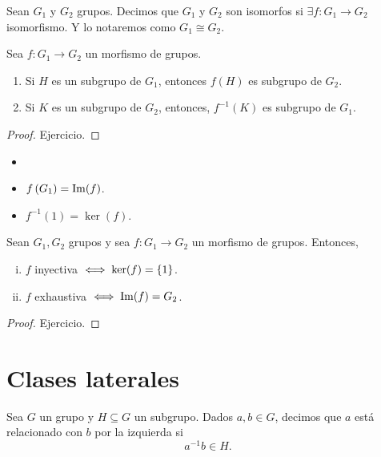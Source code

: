 \begin{defi}
    Sean $G_1$ y $G_2$ grupos. Decimos que $G_1$ y $G_2$ son isomorfos si $\exists f \colon G_1 \to G_2$
    isomorfismo. Y lo notaremos como $G_1\cong G_2$.
\end{defi}

\begin{prop}
    Sea $f \colon G_1 \to G_2$ un morfismo de grupos.
    \begin{enumerate}
        \item Si $H$ es un subgrupo de $G_1$, entonces $f(H)$ es subgrupo de $G_2$.
        \item Si $K$ es un subgrupo de $G_2$, entonces, $f^{-1}(K)$ es subgrupo de $G_1$.
    \end{enumerate}
\end{prop}

\begin{proof}
    Ejercicio.
\end{proof}

\begin{obs}
    \begin{itemize}
        \item[]
        \item $f\left( G_1 \right) = \operatorname{Im}(f)$.
        \item $f^{-1}(1) = \ker(f)$.
    \end{itemize}
\end{obs}

\begin{prop} Sean $G_1, G_2$ grupos y sea $f\colon G_1\to G_2$ un morfismo de grupos. Entonces,
    \begin{enumerate}[i)]
        \item $f$ inyectiva $\iff \ker(f) = \left\{1\right\}$.
        \item $f$ exhaustiva $\iff \operatorname{Im}(f) = G_2$.
    \end{enumerate}
\end{prop}

\begin{proof}
    Ejercicio.
\end{proof}

\section{Clases laterales}

\begin{defi}
    Sea $G$ un grupo y $H \subseteq G$ un subgrupo. Dados $a, b \in G$, decimos que
    $a$ está relacionado con $b$ por la izquierda si
    \[
        a^{-1}b \in H.
    \]
\end{defi}

